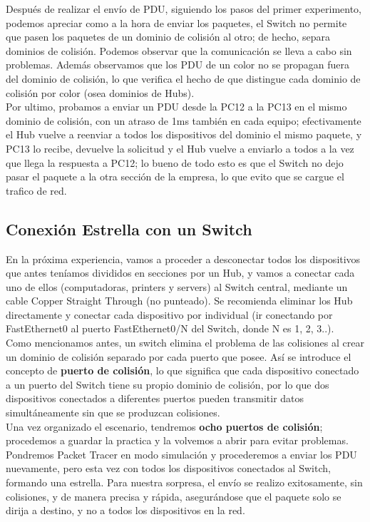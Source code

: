 \documentclass{article}
\begin{document}
{\setlength{\parindent}{1pt} Después de realizar el envío de PDU, siguiendo los pasos del primer experimento, podemos apreciar como a la hora de enviar los paquetes, el Switch no permite que pasen los paquetes de un dominio de colisión al otro; de hecho, separa dominios de colisión. Podemos observar que la comunicación se lleva a cabo sin problemas. Además observamos que los PDU de un color no se propagan fuera del dominio de colisión, lo que verifica el hecho de que distingue cada dominio de colisión por color (osea dominios de Hubs).\\

Por ultimo, probamos a enviar un PDU desde la PC12 a la PC13 en el mismo dominio de colisión, con un atraso de 1ms también en cada equipo; efectivamente el Hub vuelve a reenviar a todos los dispositivos del dominio el mismo paquete, y PC13 lo recibe, devuelve la solicitud y el Hub vuelve a enviarlo a todos a la vez que llega la respuesta a PC12; lo bueno de todo esto es que el Switch no dejo pasar el paquete a la otra sección de la empresa, lo que evito que se cargue el trafico de red. }

 
\subsection{Conexión Estrella con un Switch}

En la próxima experiencia, vamos a proceder a desconectar todos los dispositivos que antes teníamos divididos en secciones por un Hub, y vamos a conectar cada uno de ellos (computadoras, printers y servers) al Switch central, mediante un cable Copper Straight Through (no punteado). Se recomienda eliminar los Hub directamente y conectar cada dispositivo por individual (ir conectando por FastEthernet0 al puerto FastEthernet0/N del Switch, donde N es 1, 2, 3..).\\

{\setlength{\parindent}{1pt} Como mencionamos antes, un switch elimina el problema de las colisiones al crear un dominio de colisión separado por cada puerto que posee. Así se introduce el concepto de \textbf{puerto de colisión}, lo que significa que cada dispositivo conectado a un puerto del Switch tiene su propio dominio de colisión, por lo que dos dispositivos conectados a diferentes puertos pueden transmitir datos simultáneamente sin que se produzcan colisiones.\\

Una vez organizado el escenario, tendremos \textbf{ocho puertos de colisión}; procedemos a guardar la practica y la volvemos a abrir para evitar problemas. Pondremos Packet Tracer en modo simulación y procederemos a enviar los PDU nuevamente, pero esta vez con todos los dispositivos conectados al Switch, formando una estrella. Para nuestra sorpresa, el envío se realizo exitosamente, sin colisiones, y de manera precisa y rápida, asegurándose que el paquete solo se dirija a destino, y no a todos los dispositivos en la red. }
\end{document}
